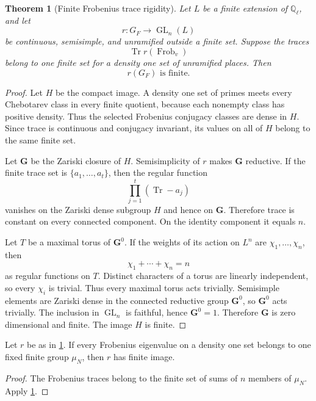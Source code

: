 \documentclass{aomart}
\newtheorem{theorem}{Theorem}[section]
\theoremstyle{definition}
\theoremstyle{remark}
\newcommand{\QQ}{\mathbb Q}
\newcommand{\GL}{\operatorname{GL}}
\newcommand{\Frob}{\operatorname{Frob}}
\newcommand{\Tr}{\operatorname{Tr}}
\begin{document}
\begin{theorem}[Finite Frobenius trace rigidity]\label{thm:finite_trace_ladic_rigidity}
Let \(L\) be a finite extension of \(\QQ_\ell\), and let
\[
 r:G_F\longrightarrow\GL_n(L)
\]
be continuous, semisimple, and unramified outside a finite set. Suppose the traces
\[
 \Tr r(\Frob_v)
\]
belong to one finite set for a density one set of unramified places. Then
\[
\boxed{
 r(G_F)\text{ is finite}.
}
\]
\end{theorem}

\begin{proof}
Let \(H\) be the compact image. A density one set of primes meets every Chebotarev class in every finite quotient, because each nonempty class has positive density. Thus the selected Frobenius conjugacy classes are dense in \(H\). Since trace is continuous and conjugacy invariant, its values on all of \(H\) belong to the same finite set.

Let \(\mathbf G\) be the Zariski closure of \(H\). Semisimplicity of \(r\) makes \(\mathbf G\) reductive. If the finite trace set is \(\{a_1,\ldots,a_t\}\), then the regular function
\[
 \prod_{j=1}^{t}
 \left(
 \Tr-a_j
 \right)
\]
vanishes on the Zariski dense subgroup \(H\) and hence on \(\mathbf G\). Therefore trace is constant on every connected component. On the identity component it equals \(n\).

Let \(T\) be a maximal torus of \(\mathbf G^0\). If the weights of its action on \(L^n\) are \(\chi_1,\ldots,\chi_n\), then
\[
 \chi_1+\cdots+\chi_n=n
\]
as regular functions on \(T\). Distinct characters of a torus are linearly independent, so every \(\chi_i\) is trivial. Thus every maximal torus acts trivially. Semisimple elements are Zariski dense in the connected reductive group \(\mathbf G^0\), so \(\mathbf G^0\) acts trivially. The inclusion in \(\GL_n\) is faithful, hence \(\mathbf G^0=1\). Therefore \(\mathbf G\) is zero dimensional and finite. The image \(H\) is finite.
\end{proof}

\begin{corollary}\label{thm:cyclotomic_ladic_rigidity}
Let \(r\) be as in \cref{thm:finite_trace_ladic_rigidity}. If every Frobenius eigenvalue on a density one set belongs to one fixed finite group \(\mu_N\), then \(r\) has finite image.
\end{corollary}

\begin{proof}
The Frobenius traces belong to the finite set of sums of \(n\) members of \(\mu_N\). Apply \cref{thm:finite_trace_ladic_rigidity}.
\end{proof}
\end{document}
